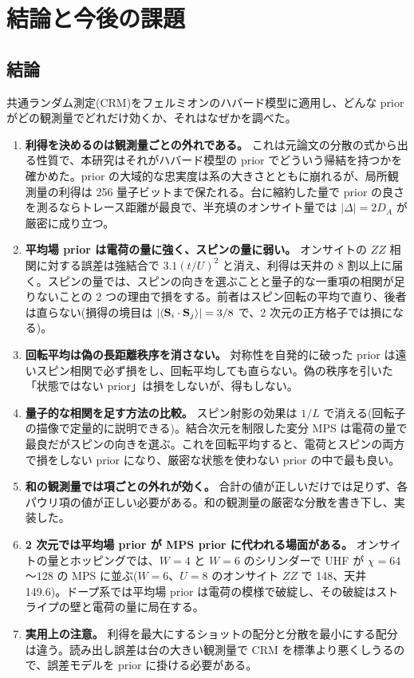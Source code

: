 \chapter{結論と今後の課題}
\label{ch:conclusion}

\section{結論}

共通ランダム測定(CRM)をフェルミオンのハバード模型に適用し、どんな prior がどの観測量でどれだけ効くか、それはなぜかを調べた。

\begin{enumerate}
  \item \textbf{利得を決めるのは観測量ごとの外れである。} これは元論文の分散の式から出る性質で、本研究はそれがハバード模型の prior でどういう帰結を持つかを確かめた。prior の大域的な忠実度は系の大きさとともに崩れるが、局所観測量の利得は 256 量子ビットまで保たれる。台に縮約した量で prior の良さを測るならトレース距離が最良で、半充填のオンサイト量では $\lvert\Delta\rvert=2D_A$ が厳密に成り立つ。
  \item \textbf{平均場 prior は電荷の量に強く、スピンの量に弱い。} オンサイトの $ZZ$ 相関に対する誤差は強結合で $3.1(t/U)^2$ と消え、利得は天井の 8 割以上に届く。スピンの量では、スピンの向きを選ぶことと量子的な一重項の相関が足りないことの 2 つの理由で損をする。前者はスピン回転の平均で直り、後者は直らない(損得の境目は $\lvert\langle \mathbf S_i\cdot\mathbf S_j\rangle\rvert=3/8$ で、2 次元の正方格子では損になる)。
  \item \textbf{回転平均は偽の長距離秩序を消さない。} 対称性を自発的に破った prior は遠いスピン相関で必ず損をし、回転平均しても直らない。偽の秩序を引いた「状態ではない prior」は損をしないが、得もしない。
  \item \textbf{量子的な相関を足す方法の比較。} スピン射影の効果は $1/L$ で消える(回転子の描像で定量的に説明できる)。結合次元を制限した変分 MPS は電荷の量で最良だがスピンの向きを選ぶ。これを回転平均すると、電荷とスピンの両方で損をしない prior になり、厳密な状態を使わない prior の中で最も良い。
  \item \textbf{和の観測量では項ごとの外れが効く。} 合計の値が正しいだけでは足りず、各パウリ項の値が正しい必要がある。和の観測量の厳密な分散を書き下し、実装した。
  \item \textbf{2 次元では平均場 prior が MPS prior に代われる場面がある。} オンサイトの量とホッピングでは、$W=4$ と $W=6$ のシリンダーで UHF が $\chi=64$〜$128$ の MPS に並ぶ($W=6$、$U=8$ のオンサイト $ZZ$ で 148、天井 149.6)。ドープ系では平均場 prior は電荷の模様で破綻し、その破綻はストライプの壁と電荷の量に局在する。
  \item \textbf{実用上の注意。} 利得を最大にするショットの配分と分散を最小にする配分は違う。読み出し誤差は台の大きい観測量で CRM を標準より悪くしうるので、誤差モデルを prior に掛ける必要がある。
\end{enumerate}

